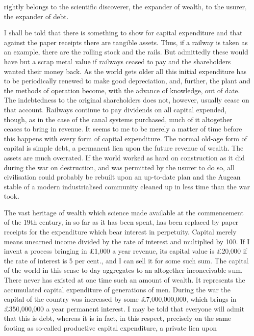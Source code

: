 \documentclass[10.5pt,twoside]{book}
\newcommand{\origpage}[1]{\clearpage\setcounter{page}{#1}}
\begin{document}
\origpage{27}

\noindent rightly belongs to the scientific discoverer, the expander of
wealth, to the usurer, the expander of debt.

I shall be told that there is something to show for capital expenditure and
that against the paper receipts there are tangible assets. Thus, if a railway
is taken as an example, there are the rolling stock and the rails. But
admittedly these would have but a scrap metal value if railways ceased to pay
and the shareholders wanted their money back. As the world gets older all this
initial expenditure has to be periodically renewed to make good depreciation,
and, further, the plant and the methods of operation become, with the advance
of knowledge, out of date. The indebtedness to the original shareholders does
not, however, usually cease on that account. Railways continue to pay
dividends on all capital expended, though, as in the case of the canal systems
purchased, much of it altogether ceases to bring in revenue. It seems to me to
be merely a matter of time before this happens with every form of capital
expenditure. The normal old-age form of capital is simple debt, a permanent
lien upon the future revenue of wealth. The assets are much overrated. If the
world worked as hard on construction as it did during the war on destruction,
and was permitted by the usurer to do so, all civilisation could probably be
rebuilt upon an up-to-date plan and the Augean stable of a modern
industrialised community cleaned up in less time than the war took.

The vast heritage of wealth which science made available at the commencement
of the 19th century, in so far as it has been spent, has been replaced by
paper receipts for the expenditure which bear interest in perpetuity. Capital
merely means unearned income divided by the rate of interest and multiplied by
100. If I invent a process bringing in \pounds1,000 a year revenue, its
capital value is \pounds20,000 if the rate of interest is 5 per cent., and I
can sell it for some such sum. The capital of the world in this sense to-day
aggregates to an altogether inconceivable sum. There never has existed at one
time such an amount of wealth. It represents the accumulated capital
expenditure of generations of men. During the war the capital of the country
was increased by some \pounds7,000,000,000, which brings in \pounds350,000,000
a year permanent interest. I may be told that everyone will admit that this is
debt, whereas it is in fact, in this respect, precisely on the same footing as
so-called productive capital expenditure, a private lien upon
\end{document}
